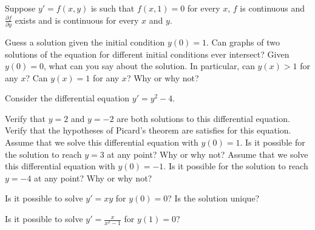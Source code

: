 \documentclass{ximera}
\begin{document}
\begin{exercise}%
    Suppose $y' = f(x,y)$ is such that $f(x,1) = 0$ for every $x$, $f$ is continuous and $\frac{\partial f}{\partial y}$ exists and is continuous for every $x$ and $y$.
    \begin{tasks}
        \task Guess a solution given the initial condition $y(0) = 1$.
        \task Can graphs of two solutions of the equation for different initial conditions ever intersect?
        \task Given $y(0) = 0$, what can you say about the solution.  In particular, can $y(x) > 1$ for any $x$?  Can $y(x) = 1$ for any $x$?  Why or why not?
    \end{tasks}
\end{exercise}

\begin{exercise}
    Consider the differential equation $y' = y^2 - 4$.
    \begin{tasks}
        \task Verify that $y=2$ and $y=-2$ are both solutions to this differential equation.
        \task Verify that the hypotheses of Picard's theorem are satisfies for this equation.
        \task Assume that we solve this differential equation with $y(0) = 1$. Is it possible for the solution to reach $y=3$ at any point? Why or why not?
        \task Assume that we solve this differential equation with $y(0) = -1$. Is it possible for the solution to reach $y=-4$ at any point? Why or why not?
    \end{tasks}
\end{exercise}

\begin{exercise}%
    Is it possible to solve $y' = xy$ for $y(0) = 0$?  Is the solution unique?
\end{exercise}

\begin{exercise}%
    Is it possible to solve $y' = \frac{x}{x^2-1}$ for $y(1) = 0$?
\end{exercise}
\end{document}
